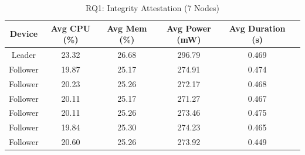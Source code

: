 \begin{table}[htbp]
\centering
\caption{RQ1: Integrity Attestation (7 Nodes)}
\label{tab:RQ1-Attestation-7Nodes-table}
\begin{tabular}{|c|c|c|c|c|c|}
\hline
\textbf{Device} & \textbf{Avg CPU (\%)} & \textbf{Avg Mem (\%)} & \textbf{Avg Power (mW)} & \textbf{Avg Duration (s)} \\
\hline
Leader & 23.32 & 26.68 & 296.79 & 0.469 \\
\hline
Follower & 19.87 & 25.17 & 274.91 & 0.474 \\
\hline
Follower & 20.23 & 25.26 & 272.17 & 0.468 \\
\hline
Follower & 20.11 & 25.17 & 271.27 & 0.467 \\
\hline
Follower & 20.11 & 25.26 & 273.46 & 0.475 \\
\hline
Follower & 19.84 & 25.30 & 274.23 & 0.465 \\
\hline
Follower & 20.60 & 25.26 & 273.92 & 0.449 \\
\hline
\end{tabular}
\end{table}
